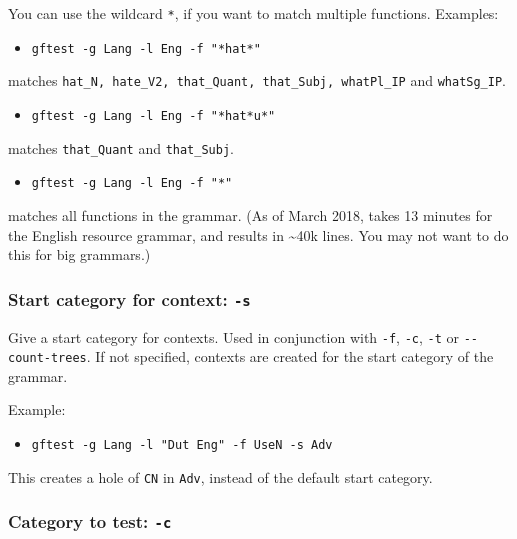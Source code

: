 You can use the wildcard \texttt{*}, if you want to match multiple
functions. Examples:

\begin{itemize}
\tightlist
\item
  \texttt{gftest\ -g\ Lang\ -l\ Eng\ -f\ "*hat*"}
\end{itemize}

matches
\texttt{hat\_N,\ hate\_V2,\ that\_Quant,\ that\_Subj,\ whatPl\_IP} and
\texttt{whatSg\_IP}.

\begin{itemize}
\tightlist
\item
  \texttt{gftest\ -g\ Lang\ -l\ Eng\ -f\ "*hat*u*"}
\end{itemize}

matches \texttt{that\_Quant} and \texttt{that\_Subj}.

\begin{itemize}
\tightlist
\item
  \texttt{gftest\ -g\ Lang\ -l\ Eng\ -f\ "*"}
\end{itemize}

matches all functions in the grammar. (As of March 2018, takes 13
minutes for the English resource grammar, and results in
\textasciitilde{}40k lines. You may not want to do this for big
grammars.)

\hypertarget{start-category-for-context--s}{%
\subsubsection{\texorpdfstring{Start category for context:
\texttt{-s}}{Start category for context: -s}}\label{start-category-for-context--s}}

Give a start category for contexts. Used in conjunction with
\texttt{-f}, \texttt{-c}, \texttt{-t} or \texttt{-\/-count-trees}. If
not specified, contexts are created for the start category of the
grammar.

Example:

\begin{itemize}
\tightlist
\item
  \texttt{gftest\ -g\ Lang\ -l\ "Dut\ Eng"\ -f\ UseN\ -s\ Adv}
\end{itemize}

This creates a hole of \texttt{CN} in \texttt{Adv}, instead of the
default start category.

\hypertarget{category-to-test--c}{%
\subsubsection{\texorpdfstring{Category to test:
\texttt{-c}}{Category to test: -c}}\label{category-to-test--c}}


